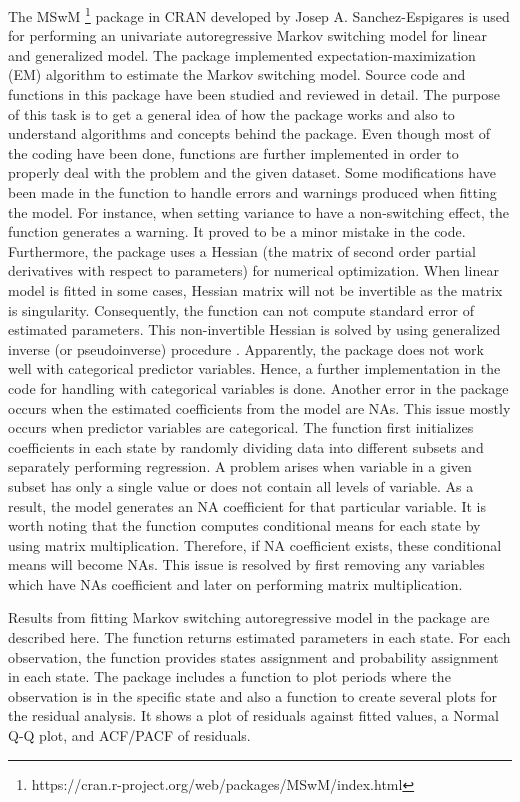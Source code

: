 \documentclass[]{article}
\begin{document}
The MSwM \footnote{https://cran.r-project.org/web/packages/MSwM/index.html} package in CRAN developed by Josep A. Sanchez-Espigares is used for performing an univariate autoregressive Markov switching model for linear and generalized model. The package implemented expectation-maximization (EM) algorithm to estimate the Markov switching model. Source code and functions in this package have been studied and reviewed in detail. The purpose of this task is to get a general idea of how the package works and also to understand algorithms and concepts behind the package. Even though most of the coding have been done, functions are further implemented in order to properly deal with the problem and the given dataset. Some modifications have been made in the function to handle errors and warnings produced when fitting the model. For instance, when setting variance to have a non-switching effect, the function generates a warning. It proved to be a minor mistake in the code. Furthermore, the package uses a Hessian (the matrix of second order partial derivatives with respect to parameters) for numerical optimization. When linear model is fitted in some cases, Hessian matrix will not be invertible as the matrix is singularity. Consequently, the function can not compute standard error of estimated parameters. This non-invertible Hessian is solved by using generalized inverse (or pseudoinverse) procedure \cite{gill2004your}. Apparently, the package does not work well with categorical predictor variables. Hence, a further implementation in the code for handling with categorical variables is done. Another error in the package occurs when the estimated coefficients from the model are NAs. This issue mostly occurs when predictor variables are categorical. The function first initializes coefficients in each state by randomly dividing data into different subsets and separately performing regression. A problem arises when variable in a given subset has only a single value or does not contain all levels of variable. As a result, the model generates an NA coefficient for that particular variable. It is worth noting that the function computes conditional means for each state by using matrix multiplication. Therefore, if NA coefficient exists, these conditional means will become NAs. This issue is resolved by first removing any variables which have NAs coefficient and later on performing matrix multiplication. 

Results from fitting Markov switching autoregressive model in the package are described here. The function returns estimated parameters in each state. For each observation, the function provides states assignment and probability assignment in each state. The package includes a function to plot periods where the observation is in the specific state and also a function to create several plots for the residual analysis. It shows a plot of residuals against fitted values, a Normal Q-Q plot, and ACF/PACF of residuals.



\end{document}
